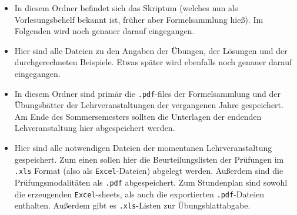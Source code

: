 \begin{itemize}
  \item {} In diesem Ordner befindet sich das
    Skriptum (welches nun als \glqq{}Vorlesungsbehelf\grqq{} bekannt ist, früher
    aber \glqq{}Formelsammlung\grqq{} hieß). Im Folgenden wird noch genauer
    darauf eingegangen.
  \item {} Hier sind alle Dateien
    zu den Angaben der Übungen, der Lösungen und der durchgerechneten Beispiele.
    Etwas später wird ebenfalls noch genauer darauf eingegangen.
  \item {} In diesem Ordner sind primär die
    {\tt .pdf}-files der Formelsammlung und der Übungsbätter der
    Lehrveranstaltungen der vergangenen Jahre gespeichert. Am Ende des
    Sommersemesters sollten die Unterlagen der endenden Lehveranstaltung hier
    abgespeichert werden.
   \item {} Hier sind alle
     notwendigen Dateien der momentanen Lehrveranstaltung gespeichert. Zum
     einen sollen hier die Beurteilungslisten der Prüfungen im {\tt .xls}
     Format (also als {\tt Excel}-Dateien) abgelegt werden. Außerdem sind die
     Prüfungsmodalitäten als {\tt .pdf} abgespeichert. Zum Stundenplan sind
     sowohl die erzeugenden {\tt Excel}-sheets, als auch die exportierten
     {\tt .pdf}-Dateien enthalten. Außerdem gibt es {\tt .xls}-Listen zur 
     Übungsblattabgabe.
\end{itemize}

